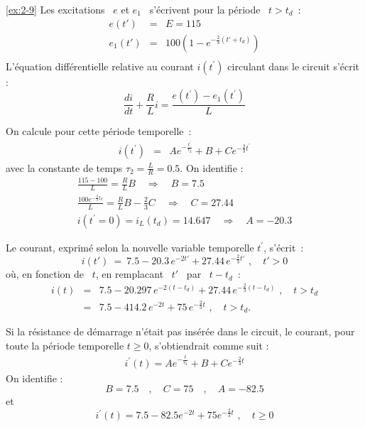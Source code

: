 \begin{solexercise}{\ref{ex:2-9}}
Les excitations \ $e$ et $e_1$ \ s'\'ecrivent pour la p\'eriode \ $t> t_d$~:
\begin{eqnarray*}
	e(t') &=& E=115 \\
	e_1(t') &=&100 \left( 1-e^{-\frac{2}{3}(t'+t_{d})} \right)\\
\end{eqnarray*}
L'\'equation diff\'erentielle relative au courant $i(t^{'})$ circulant dans le circuit s'\'ecrit :
\[\frac{di}{dt}+\frac{R}{L}i=\frac{e(t^{'})-e_1(t^{'})}{L}\]

On calcule pour cette p\'eriode temporelle~:
\begin{eqnarray*} 
	i(t^{'}) &=&  Ae^{-\frac{t^{'}}{\tau_2}}+B+Ce^{-\frac{2}{3}t^{'}}
\end{eqnarray*}
avec la constante de temps $\tau_2=\frac{L}{R}=0.5$.
On identifie :
\begin{align*}
\frac{115-100}{L}=\frac{R}{L}B\quad \Rightarrow \quad B=7.5\\
\frac{100e^{-\frac{2}{3}t_d}}{L}=\frac{R}{L}B -\frac{2}{3}C \quad \Rightarrow \quad C=27.44\\
i(t^{'}=0)=i_L(t_d)=14.647 \quad \Rightarrow \quad A=-20.3
\end{align*}


Le courant, exprim\'e selon la nouvelle variable temporelle $t^{'}$, s'\'ecrit~:
\[ i(t') \: = \: 7.5 - 20.3 \, e^{-2t'} + 27.44 \,
e^{-\frac{2}{3}t'} \,\, , \quad t'>0 \]
o\`u, en fonction de \ $t$, en rempla{c}ant \ $t'$ \ par \ $t-t_d$~:
\begin{eqnarray*}
	i(t) &=& 7.5 - 20.297 \, e^{-2(t-t_d)} + 27.44 \,
	e^{-\frac{2}{3}(t-t_d)} \,\, , \quad t > t_d\\
	&=& 7.5 - 414.2 \, e^{-2t} + 75 \, e^{-\frac{2}{3}t}  \,\, , \quad t > t_d.
\end{eqnarray*}

Si la r\'esistance de d\'emarrage n'\'etait pas  ins\'er\'ee dans le circuit,
le courant, pour toute la p\'eriode temporelle $t \geq  0$,
s'obtiendrait comme suit :
\begin{eqnarray*}
	i^{'}(t)=Ae^{-\frac{t}{\tau_2}}+B+Ce^{-\frac{2}{3}t}
\end{eqnarray*}
On identifie :
\[ B=7.5 \quad , \quad C=75 \quad , \quad A=-82.5\]
et
\[i^{'}(t)  =  7.5 - 82.5 e^{-2t} + 75 e^{-\frac{2}{3}
	t} \,\, , \quad t\geq 0\]


\end{solexercise}
